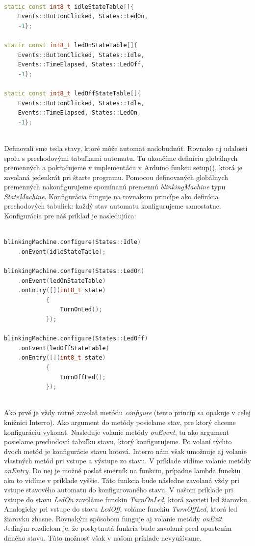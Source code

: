 \begin{lstlisting}[language=c++]  

static const int8_t idleStateTable[]{
    Events::ButtonClicked, States::LedOn,
    -1};

static const int8_t ledOnStateTable[]{
    Events::ButtonClicked, States::Idle,
    Events::TimeElapsed, States::LedOff,
    -1};

static const int8_t ledOffStateTable[]{
    Events::ButtonClicked, States::Idle,
    Events::TimeElapsed, States::LedOn,
    -1};
    
\end{lstlisting}

Definovali sme teda stavy, ktoré môže automat nadobudnúť. Rovnako aj udalosti spolu s prechodovými tabuľkami automatu.
Tu ukončíme definíciu globálnych premenných a pokračujeme v implementácii v Arduino funkcii setup(), ktorá je zavolaná jedenkrát pri štarte programu.
Pomocou definovaných globálnych premenných nakonfigurujeme spomínanú premennú \textit{blinkingMachine} typu \textit{StateMachine}. Konfigurácia funguje
na rovnakom princípe ako definícia prechodových tabuliek: každý stav automatu konfigurujeme samostatne. Konfigurácia pre náš príklad je nasledujúca:

\begin{lstlisting}[language=c++]  

blinkingMachine.configure(States::Idle)
    .onEvent(idleStateTable);

blinkingMachine.configure(States::LedOn)
    .onEvent(ledOnStateTable)
    .onEntry([](int8_t state)
            {
                TurnOnLed();
            });

blinkingMachine.configure(States::LedOff)
    .onEvent(ledOffStateTable)
    .onEntry([](int8_t state)
            { 
                TurnOffLed();
            });
        
    \end{lstlisting}

Ako prvé je vždy nutné zavolať metódu \textit{configure} (tento princíp sa opakuje v celej knižnici Interro).
Ako argument do metódy posielame stav, pre ktorý chceme konfiguráciu vykonať. Nasleduje volanie metódy \textit{onEvent}, tu ako argument posielame prechodovú tabuľku
stavu, ktorý konfigurujeme. Po volaní týchto dvoch metód je konfigurácie stavu hotová. Interro nám však umožnuje aj volanie vlastných metód pri vstupe a
výstupe zo stavu. V príklade vidíme volanie metódy  \textit{onEntry}. Do nej je možné poslať smerník na funkciu, prípadne lambda funckiu ako to vidíme
v príklade vyššie. Táto funkcia bude následne zavolaná vždy pri vstupe stavového automatu do konfigurovaného stavu. V našom príklade pri vstupe do stavu
\textit{LedOn} zavoláme funckiu \textit{TurnOnLed}, ktorá zasvieti led žiarovku. Analogicky pri vstupe do stavu \textit{LedOff}, voláme funckiu \textit{TurnOffLed},
ktorá led žiarovku zhasne. Rovnakým spôsobom funguje aj volanie metódy
\textit{onExit}. Jediným rozdielom je, že poskytnutá funkcia bude zavolaná pred opustením daného stavu. Túto možnosť však v našom príklade nevyužívame.

